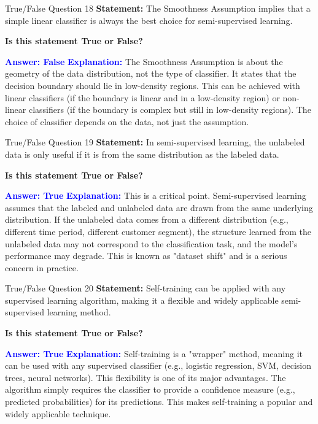 \documentclass{beamer}
\begin{document}
	\begin{frame}{True/False Question 18}
		\textbf{Statement:} The Smoothness Assumption implies that a simple linear classifier is always the best choice for semi-supervised learning.
		
		\vspace{0.3cm}
		\textbf{Is this statement True or False?}
		
		\vspace{0.2cm}
		\textcolor{blue}{\textbf{Answer: False}}
		\vspace{0.2cm}
		\textcolor{blue}{\textbf{Explanation:}} The Smoothness Assumption is about the geometry of the data distribution, not the type of classifier. It states that the decision boundary should lie in low-density regions. This can be achieved with linear classifiers (if the boundary is linear and in a low-density region) or non-linear classifiers (if the boundary is complex but still in low-density regions). The choice of classifier depends on the data, not just the assumption.
	\end{frame}
	
	\begin{frame}{True/False Question 19}
		\textbf{Statement:} In semi-supervised learning, the unlabeled data is only useful if it is from the same distribution as the labeled data.
		
		\vspace{0.3cm}
		\textbf{Is this statement True or False?}
		
		\vspace{0.2cm}
		\textcolor{blue}{\textbf{Answer: True}}
		\vspace{0.2cm}
		\textcolor{blue}{\textbf{Explanation:}} This is a critical point. Semi-supervised learning assumes that the labeled and unlabeled data are drawn from the same underlying distribution. If the unlabeled data comes from a different distribution (e.g., different time period, different customer segment), the structure learned from the unlabeled data may not correspond to the classification task, and the model's performance may degrade. This is known as "dataset shift" and is a serious concern in practice.
	\end{frame}
	
	\begin{frame}{True/False Question 20}
		\textbf{Statement:} Self-training can be applied with any supervised learning algorithm, making it a flexible and widely applicable semi-supervised learning method.
		
		\vspace{0.3cm}
		\textbf{Is this statement True or False?}
		
		\vspace{0.2cm}
		\textcolor{blue}{\textbf{Answer: True}}
		\vspace{0.2cm}
		\textcolor{blue}{\textbf{Explanation:}} Self-training is a "wrapper" method, meaning it can be used with any supervised classifier (e.g., logistic regression, SVM, decision trees, neural networks). This flexibility is one of its major advantages. The algorithm simply requires the classifier to provide a confidence measure (e.g., predicted probabilities) for its predictions. This makes self-training a popular and widely applicable technique.
	\end{frame}
	
\end{document}
